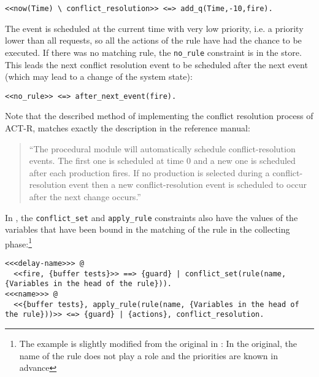 \begin{lstlisting}
<<now(Time) \ conflict_resolution>> <=> add_q(Time,-10,fire).
\end{lstlisting}

The event is scheduled at the current time with very low priority, i.e. a priority lower than all requests, so all the actions of the rule have had the chance to be executed. If there was no matching rule, the \lstinline|no_rule| constraint is in the store. This leads the next conflict resolution event to be scheduled after the next event (which may lead to a change of the system state):

\begin{lstlisting}
<<no_rule>> <=> after_next_event(fire).
\end{lstlisting}

Note that the described method of implementing the conflict resolution process of ACT-R, matches exactly the description in the reference manual:

\begin{quote}
``The procedural module will automatically schedule conflict-resolution events. The first one is
scheduled at time 0 and a new one is scheduled after each production fires. If no production is
selected during a conflict-resolution event then a new conflict-resolution event is scheduled to occur
after the next change occurs.'' \cite[156]{actr_reference}
\end{quote}

In \cite{fru_chr_book_2009}, the \lstinline|conflict_set| and \lstinline|apply_rule| constraints also have the values of the variables that have been bound in the matching of the rule in the collecting phase:\footnote{The example is slightly modified from the original in \cite{fru_chr_book_2009}: In the original, the name of the rule does not play a role and the priorities are known in advance} 

\begin{lstlisting}
<<<delay-name>>> @
  <<fire, {buffer tests}>> ==> {guard} | conflict_set(rule(name, {Variables in the head of the rule})).
<<<name>>> @
  <<{buffer tests}, apply_rule(rule(name, {Variables in the head of the rule}))>> <=> {guard} | {actions}, conflict_resolution.
\end{lstlisting}


